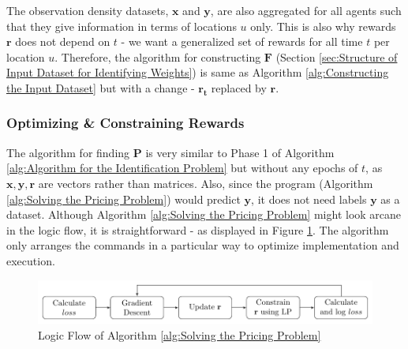 \documentclass[12pt]{article}
\newcommand{\vect}[1]{\mathbf{#1}}  %
\newcommand{\matr}[1]{\mathbf{#1}}  %
\begin{document}
    The observation density datasets, $\matr{x}$ and $\matr{y}$, are also aggregated for all agents such that they give information in terms of locations $u$ only. This is also why rewards $\vect{r}$ does not depend on $t$ - we want a generalized set of rewards for all time $t$ per location $u$. Therefore, the algorithm for constructing $\matr{F}$ (Section \ref{sec:Structure of Input Dataset for Identifying Weights}) is same as Algorithm \ref{alg:Constructing the Input Dataset} but with a change - $\vect{r_t}$ replaced by $\vect{r}$.
    
    \subsubsection{Optimizing \& Constraining Rewards} \label{sec:Optimizing and Constraining Rewards}
    The algorithm for finding $\matr{P}$ is very similar to Phase 1 of Algorithm \ref{alg:Algorithm for the Identification Problem} but without any epochs of $t$, as $\vect{x}, \vect{y}, \vect{r}$ are vectors rather than matrices. Also, since the program (Algorithm \ref{alg:Solving the Pricing Problem}) would predict $\vect{y}$, it does not need labels $\vect{y}$ as a dataset. Although Algorithm \ref{alg:Solving the Pricing Problem} might look arcane in the logic flow, it is straightforward - as displayed in Figure \ref{fig:Logic Flow of Algorithm Pricing Problem}. The algorithm only arranges the commands in a particular way to optimize implementation and execution.
    \begin{figure}[!htbp]
        \centering
        \includegraphics[width=\textwidth]{logic_alg_pricing}
        \caption{Logic Flow of Algorithm \ref{alg:Solving the Pricing Problem}}
        \label{fig:Logic Flow of Algorithm Pricing Problem}
    \end{figure}
\end{document}
